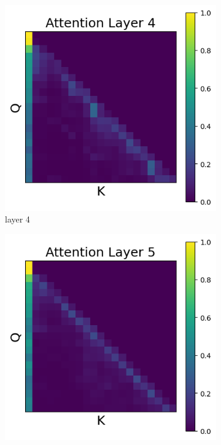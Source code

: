 \documentclass[11pt]{article}
\begin{document}
\begin{figure}[t]
  \begin{subfigure}[t]{0.24\textwidth}
    \centering
    \includegraphics[width=1.4\columnwidth]{figures/intervention4/layer_4.png}
    \caption{layer 4}
    \label{fig:obs2_layer4}
  \end{subfigure}\hfill
  \begin{subfigure}[t]{0.24\textwidth}
    \centering
    \includegraphics[width=1.4\columnwidth]{figures/intervention4/layer_5.png}

\end{subfigure}
\end{figure}
\end{document}
